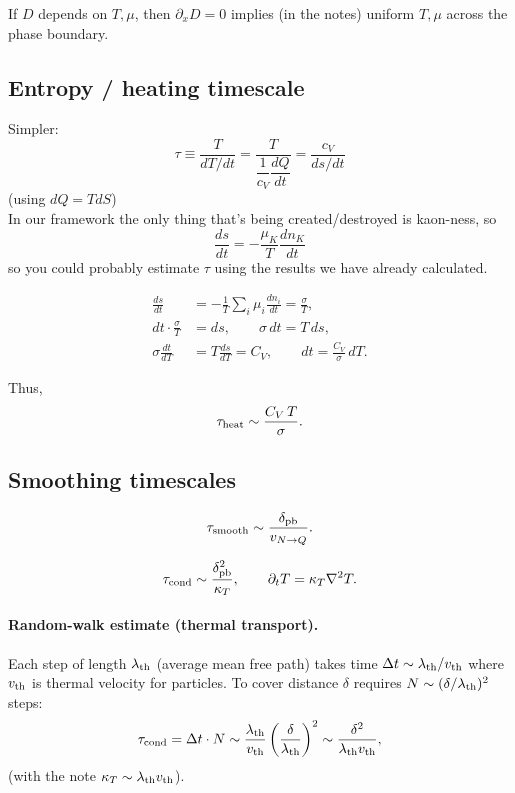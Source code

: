 \documentclass[11pt]{article}
\newcommand{\mga}[1]{{\color[rgb]{0.8,0,0}#1}}
\begin{document}
If $D$ depends on $T,\mu$, then $\partial_x D=0$ implies (in the notes) uniform $T,\mu$ across the phase boundary.

\subsection{Entropy / heating timescale}
\mga{Simpler:
\begin{equation}
\tau \equiv \dfrac{T}{dT/dt} = \dfrac{T}{\dfrac{1}{c_V}\dfrac{dQ}{dt}} = \dfrac{c_V}{ds/dt}
\end{equation}
(using $dQ=TdS$)\\
In our framework the only thing that's being created/destroyed is kaon-ness, so
\begin{equation} \dfrac{ds}{dt} = -\dfrac{\mu_K}{T} \dfrac{dn_K}{dt}
\end{equation}
so you could probably estimate $\tau$ using the results we have already calculated. 
}

\begin{align}
\frac{ds}{dt}
&= -\frac{1}{T}\sum_i \mu_i \frac{d n_i}{dt}
= \frac{\sigma}{T},
\\
dt \cdot \frac{\sigma}{T} &= ds,
\qquad
\sigma\,dt = T\,ds,
\\
\sigma \frac{dt}{dT}
&= T \frac{ds}{dT}
= C_V,
\qquad
dt = \frac{C_V}{\sigma}\,dT.
\end{align}

Thus,
\begin{equation}
\tau_{\rm heat} \sim \frac{C_V\,T}{\sigma}.
\end{equation}

\subsection{Smoothing timescales}

\begin{equation}
\tau_{\rm smooth} \sim \frac{\delta_{\rm pb}}{v_{N\to Q}}.
\end{equation}

\begin{equation}
\tau_{\rm cond} \sim \frac{\delta_{\rm pb}^2}{\kappa_T},
\qquad
\partial_t T = \kappa_T \nabla^2 T.
\end{equation}

\paragraph{Random-walk estimate (thermal transport).}
Each step of length $\lambda_{\rm th}$ (average mean free path) takes time $\Delta t\sim \lambda_{\rm th}/v_{\rm th}$ where $v_{\rm th}$ is thermal velocity for particles.
To cover distance $\delta$ requires $N\sim (\delta/\lambda_{\rm th})^2$ steps:
\begin{equation}
\tau_{\rm cond} = \Delta t \cdot N
\sim \frac{\lambda_{\rm th}}{v_{\rm th}}\left(\frac{\delta}{\lambda_{\rm th}}\right)^2
\sim \frac{\delta^2}{\lambda_{\rm th} v_{\rm th}},
\end{equation}
(with the note $\kappa_T \sim \lambda_{\rm th} v_{\rm th}$).
\end{document}
